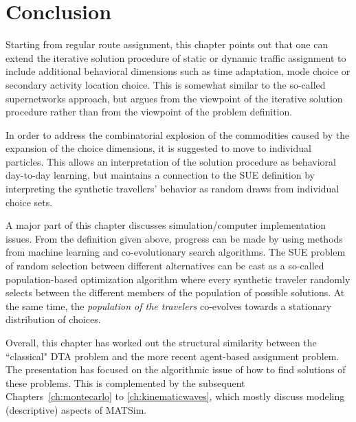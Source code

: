\section{Conclusion}
\label{sec:agentbased-dta-conclusion}

Starting from
regular route assignment, this chapter points out that one can extend the
iterative solution procedure of static or dynamic traffic assignment
to include additional behavioral dimensions such as time adaptation,
mode choice or secondary activity location choice.  This is somewhat
similar to the so-called supernetworks approach, but argues from the
viewpoint of the iterative solution procedure rather than from the
viewpoint of the problem definition.

In order to address the combinatorial explosion of the commodities
caused by the expansion of the choice dimensions, it is suggested to
move to individual particles.  This allows an interpretation of the
solution procedure as behavioral day-to-day learning, but maintains a
connection to the SUE definition by interpreting the synthetic
travellers' behavior as random draws from individual choice sets.  

A major part of this chapter discusses simulation/computer implementation issues.
From the definition given above, progress can be made by using methods
from machine learning and co-evolutionary search algorithms.  
%
The SUE problem of random selection between different alternatives can
be cast as a so-called population-based optimization algorithm where
every synthetic traveler randomly selects between the different
members of the population of possible solutions.
%
At the same time, the \emph{population of the travelers} co-evolves
towards a stationary distribution of choices.

Overall, this chapter has worked out the structural similarity between the 
``classical" DTA problem and the more recent agent-based assignment problem.
The presentation has focused on the algorithmic issue of how to find solutions 
of these problems. This is complemented by the subsequent Chapters~\ref{ch:montecarlo} to \ref{ch:kinematicwaves}, 
which mostly discuss modeling (descriptive) aspects of MATSim.

